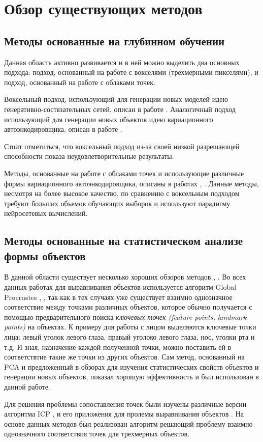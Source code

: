 \section{Обзор существующих методов}

\subsection{Методы основанные на глубинном обучении}

Данная область активно развивается и в ней можно выделить два основных подхода: подход, основанный на работе с вокселями (трехмерными пикселями), и подход, основанный на работе с облаками точек. \par
Воксельный подход, использующий для генерации новых моделей идею генеративно-состязательных сетей, описан в работе \cite{3d-gan}. Аналогичный подход использующий для генерации новых объектов идею вариационного автоэнкодировщика, описан в работе \cite{3d-autoencoder}.\par
Стоит отметиться, что воксельный подход из-за своей низкой разрешающей способности показа неудовлетворительные результаты.

Методы, основанные на работе с облаками точек и использующие различные формы вариационного автоэнкодировщика, описаны в работах \cite{lrgm-cloud}, \cite{adversarial-autoencoder}. Данные методы, несмотря на более высокое качество, по сравнению с воксельным подходом требуют больших объемов обучающих выборок и используют парадигму нейросетевых вычислений.

\subsection{Методы основанные на статистическом анализе формы объектов}

В данной области существует несколько хороших обзоров методов \cite{stat-shape-1}, \cite{stat-shape-2}.
Во всех данных работах для выравнивания объектов используется алгоритм Global Procrustes \cite{procrustes-1}, \cite{procrustes-2}, так-как в тех случаях уже существует взаимно однозначное соответствие между точками различных объектов, которое обычно получается с помощью предварительного поиска 
\textit{ключевых точек (feature points, landmark points)} на объектах. К примеру для работы с лицом выделяются ключевые точки лица: левый уголок левого глаза, правый уголоко левого глаза, нос, уголки рта и т.д. И зная, назначение каждой полученной точки, можно поставить ей в соответствтие такие же точки из других объектов. 
Сам метод, основанный на PCA и предложенный в обзорах для изучения статистических свойств объектов и генерации новых объектов, показал хорошую эффективность и был использован в данной работе. \par
Для решения проблемы сопоставления точек были изучены различные версии алгоритма ICP \cite{icp-main}, \cite{icp-2} и его приложения для пролемы выравнивания объектов \cite{non-rigid-icp}. На основе данных методов был реализован алгоритм решающий проблему взаимно однозначного соответствия точек для трехмерных объектов.

